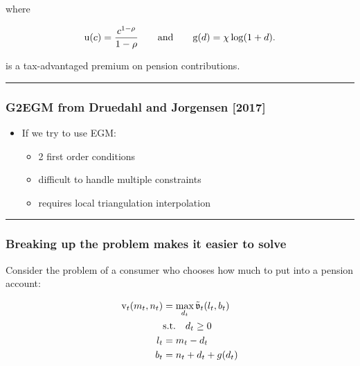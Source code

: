 \documentclass[
  letterpaper,
  DIV=11,
  numbers=noendperiod]{scrartcl}
\providecommand{\tightlist}{%
  \setlength{\itemsep}{0pt}\setlength{\parskip}{0pt}}\usepackage{longtable,booktabs,array}
\begin{document}
where

\[\begin{equation}
  \mathrm{u}(c) = \frac{c^{1-\rho}}{1-\rho} \qquad \text{and} \qquad \mathrm{g}(d) = \chi \log(1+d).
\end{equation}\]

is a tax-advantaged premium on pension contributions.

\begin{center}\rule{0.5\linewidth}{0.5pt}\end{center}

\hypertarget{g2egm-from-druedahl-and-jorgensen-2017}{%
\subsubsection{G2EGM from Druedahl and Jorgensen
{[}2017{]}}\label{g2egm-from-druedahl-and-jorgensen-2017}}

\begin{itemize}
\tightlist
\item
  If we try to use EGM:

  \begin{itemize}
  \tightlist
  \item
    2 first order conditions
  \item
    difficult to handle multiple constraints
  \item
    requires local triangulation interpolation
  \end{itemize}
\end{itemize}

\begin{center}\rule{0.5\linewidth}{0.5pt}\end{center}

\hypertarget{breaking-up-the-problem-makes-it-easier-to-solve}{%
\subsubsection{Breaking up the problem makes it easier to
solve}\label{breaking-up-the-problem-makes-it-easier-to-solve}}

Consider the problem of a consumer who chooses how much to put into a
pension account:

\[\begin{equation}
\begin{split}
    \mathrm{v}_{t}(m_{t}, n_{t}) & = \max_{d_{t}} \tilde{\mathfrak{v}}_{t}(l_{t}, b_{t}) \\
    & \text{s.t.}  \quad d_{t} \ge 0 \\
    l_{t} & = m_{t} - d_{t} \\
    b_{t} & = n_{t} + d_{t} + g(d_{t})
  \end{split}
\end{equation}\]
\end{document}
